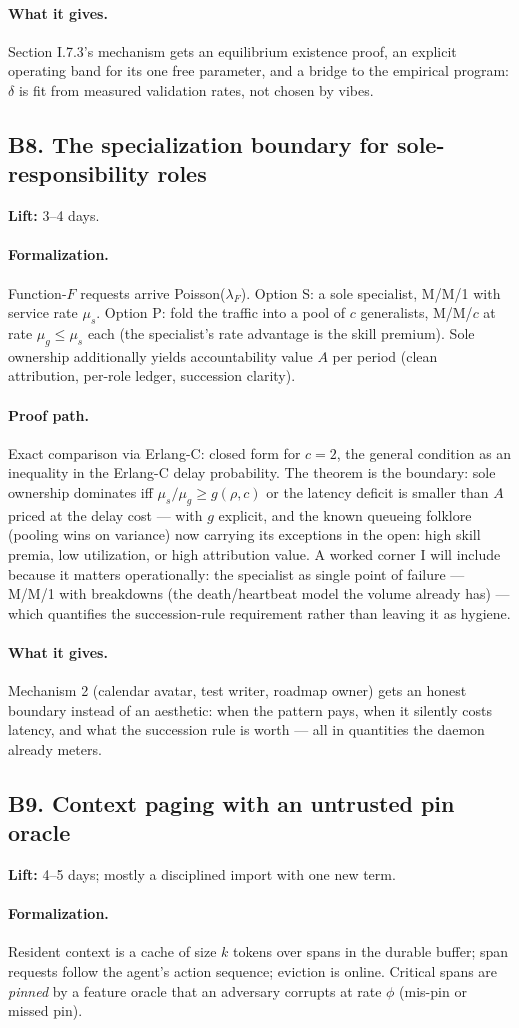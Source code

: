 \documentclass[11pt,a4paper]{article}
\newcommand{\lift}[1]{\noindent\textbf{Lift:} #1.}
\newcommand{\gives}{\paragraph{What it gives.}}
\newcommand{\form}{\paragraph{Formalization.}}
\newcommand{\proofpath}{\paragraph{Proof path.}}
\begin{document}
\gives Section I.7.3's mechanism gets an equilibrium existence proof, an explicit operating band for its one free parameter, and a bridge to the empirical program: $\delta$ is fit from measured validation rates, not chosen by vibes.

\subsection{B8. The specialization boundary for sole-responsibility roles}
\lift{3--4 days}

\form Function-$F$ requests arrive Poisson($\lambda_F$). Option S: a sole specialist, M/M/1 with service rate $\mu_s$. Option P: fold the traffic into a pool of $c$ generalists, M/M/$c$ at rate $\mu_g \le \mu_s$ each (the specialist's rate advantage is the skill premium). Sole ownership additionally yields accountability value $A$ per period (clean attribution, per-role ledger, succession clarity).

\proofpath Exact comparison via Erlang-C: closed form for $c=2$, the general condition as an inequality in the Erlang-C delay probability. The theorem is the boundary: sole ownership dominates iff $\mu_s/\mu_g \ge g(\rho, c)$ or the latency deficit is smaller than $A$ priced at the delay cost --- with $g$ explicit, and the known queueing folklore (pooling wins on variance) now carrying its exceptions in the open: high skill premia, low utilization, or high attribution value. A worked corner I will include because it matters operationally: the specialist as single point of failure --- M/M/1 with breakdowns (the death/heartbeat model the volume already has) --- which quantifies the succession-rule requirement rather than leaving it as hygiene.

\gives Mechanism 2 (calendar avatar, test writer, roadmap owner) gets an honest boundary instead of an aesthetic: when the pattern pays, when it silently costs latency, and what the succession rule is worth --- all in quantities the daemon already meters.

\subsection{B9. Context paging with an untrusted pin oracle}
\lift{4--5 days; mostly a disciplined import with one new term}

\form Resident context is a cache of size $k$ tokens over spans in the durable buffer; span requests follow the agent's action sequence; eviction is online. Critical spans are \emph{pinned} by a feature oracle that an adversary corrupts at rate $\phi$ (mis-pin or missed pin).
\end{document}
